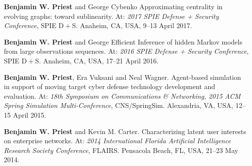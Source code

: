 \item \textbf{Benjamin W. Priest} and George Cybenko 
	Approximating centrality in evolving graphs: toward sublinearity.
	At: \emph{2017 SPIE Defense + Security Conference}, 
	SPIE D$\! + \!$S. 
	Anaheim, CA, USA,
        9--13 April 2017.

\item \textbf{Benjamin W. Priest} and George 
	Efficient Inference of hidden Markov models from large observations sequences.
	At: \emph{2016 SPIE Defense + Security Conference}, 
	SPIE D$\! + \!$S. 
	Anaheim, CA, USA,
        17--21 April 2016.

\item \textbf{Benjamin W. Priest}, Era Vuksani and Neal Wagner.
	Agent-based simulation in support of moving target cyber defense technology development and evaluation.
	At: \emph{18th Symposium on Communications \& Networking, 2015 ACM Spring Simulation Multi-Conference}, 
	CNS/SpringSim. 
	Alexandria, VA, USA,
        12--15 April 2015.

\item \textbf{Benjamin W. Priest} and Kevin M. Carter.
	Characterizing latent user interests on enterprise networks.
	At: \emph{2014 International Florida Artificial Intelligence Research Society Conference},
	FLAIRS.
	Pensacola Beach, FL, USA,
	21--23 May 2014.
